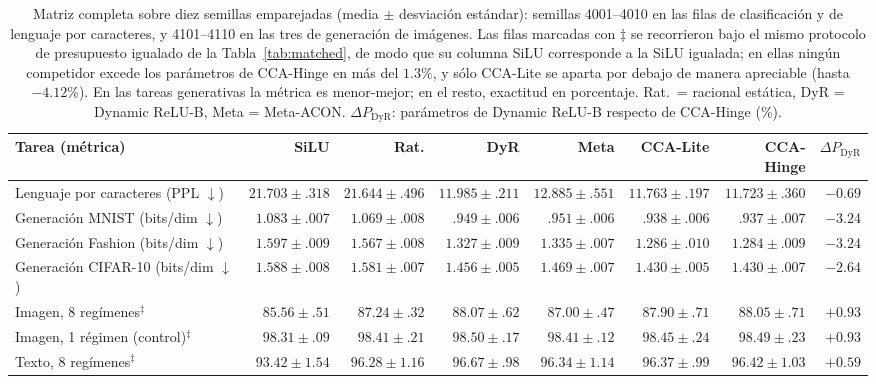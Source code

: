 \begin{multicols}{2}
\begin{table}[t]
\centering
\caption{Matriz completa sobre diez semillas emparejadas (media $\pm$ desviación estándar): semillas 4001--4010 en las filas de clasificación y de lenguaje por caracteres, y 4101--4110 en las tres de generación de imágenes. Las filas marcadas con $\ddagger$ se recorrieron bajo el mismo protocolo de presupuesto igualado de la Tabla~\ref{tab:matched}, de modo que su columna SiLU corresponde a la SiLU igualada; en ellas ningún competidor excede los parámetros de CCA-Hinge en más del $1.3\%$, y sólo CCA-Lite se aparta por debajo de manera apreciable (hasta $-4.12\%$). En las tareas generativas la métrica es menor-mejor; en el resto, exactitud en porcentaje. Rat.\ = racional estática, DyR = Dynamic ReLU-B, Meta = Meta-ACON. $\Delta P_{\mathrm{DyR}}$: parámetros de Dynamic ReLU-B respecto de CCA-Hinge (\%).}
\label{tab:matrix}
\scriptsize
\setlength{\tabcolsep}{2.8pt}
\begin{tabular}{@{}lrrrrrrr@{}}
\toprule
\textbf{Tarea (métrica)} & \textbf{SiLU} & \textbf{Rat.} & \textbf{DyR} & \textbf{Meta} & \textbf{CCA-Lite} & \textbf{CCA-Hinge} & $\Delta P_{\mathrm{DyR}}$\\
\midrule
Lenguaje por caracteres (PPL $\downarrow$) & $21.703{\pm}.318$ & $21.644{\pm}.496$ & $11.985{\pm}.211$ & $12.885{\pm}.551$ & $11.763{\pm}.197$ & $\mathbf{11.723{\pm}.360}$ & $-0.69$\\
Generación MNIST (bits/dim $\downarrow$) & $1.083{\pm}.007$ & $1.069{\pm}.008$ & $.949{\pm}.006$ & $.951{\pm}.006$ & $.938{\pm}.006$ & $\mathbf{.937{\pm}.007}$ & $-3.24$\\
Generación Fashion (bits/dim $\downarrow$) & $1.597{\pm}.009$ & $1.567{\pm}.008$ & $1.327{\pm}.009$ & $1.335{\pm}.007$ & $1.286{\pm}.010$ & $\mathbf{1.284{\pm}.009}$ & $-3.24$\\
Generación CIFAR-10 (bits/dim $\downarrow$) & $1.588{\pm}.008$ & $1.581{\pm}.007$ & $1.456{\pm}.005$ & $1.469{\pm}.007$ & $1.430{\pm}.005$ & $\mathbf{1.430{\pm}.007}$ & $-2.64$\\
Imagen, 8 regímenes$^{\ddagger}$ & $85.56{\pm}.51$ & $87.24{\pm}.32$ & $\mathbf{88.07{\pm}.62}$ & $87.00{\pm}.47$ & $87.90{\pm}.71$ & $88.05{\pm}.71$ & $+0.93$\\
Imagen, 1 régimen (control)$^{\ddagger}$ & $98.31{\pm}.09$ & $98.41{\pm}.21$ & $\mathbf{98.50{\pm}.17}$ & $98.41{\pm}.12$ & $98.45{\pm}.24$ & $98.49{\pm}.23$ & $+0.93$\\
Texto, 8 regímenes$^{\ddagger}$ & $93.42{\pm}1.54$ & $96.28{\pm}1.16$ & $\mathbf{96.67{\pm}.98}$ & $96.34{\pm}1.14$ & $96.37{\pm}.99$ & $96.42{\pm}1.03$ & $+0.59$\\

\end{tabular}
\end{table}
\end{multicols}
